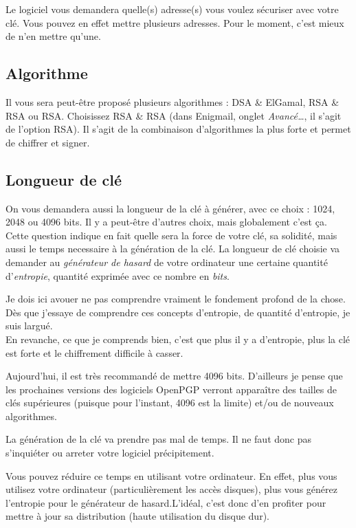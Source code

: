 Le logiciel vous demandera quelle(s) adresse(s) vous voulez sécuriser
avec votre clé. Vous pouvez en effet mettre plusieurs adresses. Pour le
moment, c'est mieux de n'en mettre qu'une.

\subsection{Algorithme}\label{algorithme}

Il vous sera peut-être proposé plusieurs algorithmes : DSA \& ElGamal,
RSA \& RSA ou RSA. Choisissez RSA \& RSA (dans Enigmail, onglet \emph{Avancé\ldots{}}, il
s'agit de l'option RSA). Il s'agit de la combinaison d'algorithmes la
plus forte et permet de chiffrer et signer.

\subsection{Longueur de clé}\label{longueur-de-cluxe9}

On vous demandera aussi la longueur de la clé à générer, avec ce choix :
1024, 2048 ou 4096 bits. Il y a peut-être d'autres choix, mais
globalement c'est ça. Cette question indique en fait quelle sera la force de votre clé, sa
solidité, mais aussi le temps necessaire à la génération de la clé. La longueur de clé choisie va demander au \emph{générateur de hasard} de
votre ordinateur une certaine quantité d'\emph{entropie}, quantité
exprimée avec ce nombre en \emph{bits}.

\begin{notice}
Je dois ici avouer ne pas comprendre vraiment le fondement profond de la
chose.\\Dès que j'essaye de comprendre ces concepts d'entropie, de
quantité d'entropie, je suis largué.\\En revanche, ce que je comprends
bien, c'est que plus il y a d'entropie, plus la clé est forte et le
chiffrement difficile à casser.
\end{notice}

Aujourd'hui, il est très recommandé de mettre 4096 bits. D'ailleurs je
pense que les prochaines versions des logiciels OpenPGP verront
apparaître des tailles de clés supérieures (puisque pour l'instant, 4096
est la limite) et/ou de nouveaux algorithmes.

La génération de la clé va prendre pas mal de temps. Il ne faut donc pas
s'inquiéter ou arreter votre logiciel précipitement.

Vous pouvez réduire ce temps en utilisant votre ordinateur. En effet,
plus vous utilisez votre ordinateur (particulièrement les accès
disques), plus vous générez l'entropie pour le générateur de
hasard.L'idéal, c'est donc d'en profiter pour mettre à jour sa
distribution (haute utilisation du disque dur).

